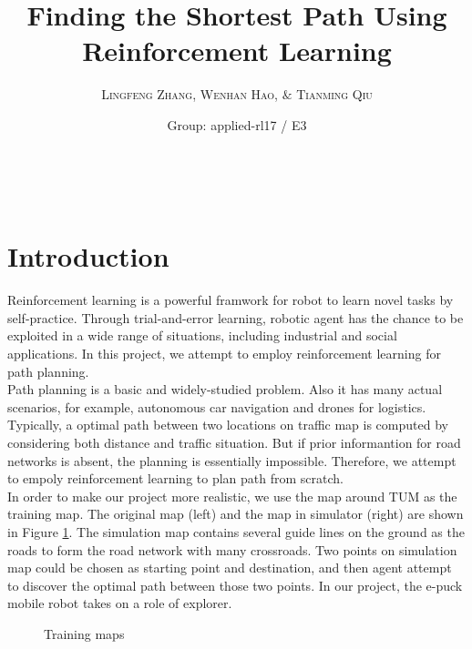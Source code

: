 \documentclass[a4paper, 11pt]{article} %
\title{\textbf{Finding the Shortest Path Using Reinforcement Learning}} %
\author{\textsc{Lingfeng Zhang, Wenhan Hao, $\&$ Tianming Qiu} %
\\{\textit{}}} %
\date{Group: applied-rl17 / E3} %
\makeatletter
\renewcommand{\maketitle}{ %
\begin{flushright} %
{\LARGE\@title} %

\vspace{50pt} %

{\large\@author} %
\\\@date %

\vspace{40pt} %
\end{flushright}
}
\makeatother
\begin{document}
\maketitle %



\section{Introduction}
Reinforcement learning is a powerful framwork for robot to learn novel tasks by
self-practice. Through trial-and-error learning, robotic agent has the chance to
be exploited in a wide range of situations, including industrial and social
applications. In this project, we attempt to employ reinforcement learning for
path planning.
\\[3ex]
Path planning is a basic and widely-studied problem. Also it has many actual
scenarios, for example, autonomous car navigation and drones for logistics.
Typically, a optimal path between two locations on traffic map is computed by
considering both distance and traffic situation. But if prior informantion for
road networks is absent, the planning is essentially impossible. Therefore,
we attempt to empoly reinforcement learning to plan path from scratch.
\\[3ex]
In order to make our project more realistic, we use the map around TUM as the
training map. The original map (left) and the map in simulator (right) are shown
in Figure \ref{fig1}. The simulation map contains several guide lines on the
ground as the roads to form the road network with many crossroads. Two points on
simulation map could be chosen as starting point and destination, and then agent
attempt to discover the optimal path between those two points. In our project,
the e-puck mobile robot takes on a role of explorer.
\begin{figure}[tbp]
\centering
{}
\caption{Training maps}
\label{fig1}
\end{figure}
\end{document}
